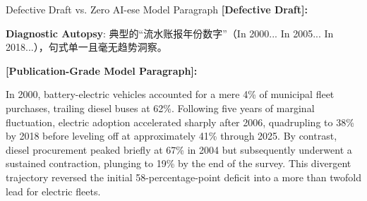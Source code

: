\begin{ExampleBox}{Defective Draft vs. Zero AI-ese Model Paragraph}
\textbf{\color{TargetHighlight}[Defective Draft]:}\par
{}\par\vspace{4pt}
\textbf{Diagnostic Autopsy}: 典型的“流水账报年份数字”（In 2000... In 2005... In 2018...），句式单一且毫无趋势洞察。\par\vspace{6pt}
\textbf{\color{AcadNavy}[Publication-Grade Model Paragraph]:}\par
In 2000, battery-electric vehicles accounted for a mere 4\% of municipal fleet purchases, trailing diesel buses at 62\%. Following five years of marginal fluctuation, electric adoption accelerated sharply after 2006, quadrupling to 38\% by 2018 before leveling off at approximately 41\% through 2025. By contrast, diesel procurement peaked briefly at 67\% in 2004 but subsequently underwent a sustained contraction, plunging to 19\% by the end of the survey. This divergent trajectory reversed the initial 58-percentage-point deficit into a more than twofold lead for electric fleets.
\end{ExampleBox}
